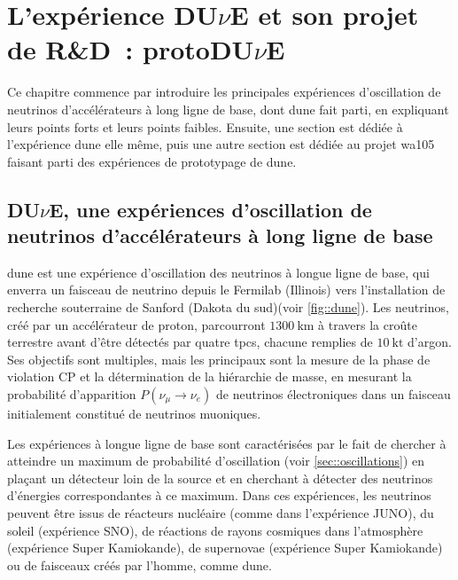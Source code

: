\chapter{L'expérience \texorpdfstring{DU$\nu$E}{DUNE} et son projet de R\&D~: \texorpdfstring{protoDU$\nu$E}{protoDUNE}}
    
    Ce chapitre commence par introduire les principales expériences d'oscillation de neutrinos d'accélérateurs à long ligne de base, dont \gls{dune} fait parti, en expliquant leurs points forts et leurs points faibles. Ensuite, une section est dédiée à l'expérience \gls{dune} elle même, puis une autre section est dédiée au projet \gls{wa105} faisant parti des expériences de prototypage de \gls{dune}.
        
    \section{DU$\nu$E, une expériences d'oscillation de neutrinos d'accélérateurs à long ligne de base}
    
        \gls{dune} est une expérience d'oscillation des neutrinos à longue ligne de base, qui enverra un faisceau de neutrino depuis le Fermilab (Illinois) vers l'installation de recherche souterraine de Sanford (Dakota du sud)(voir \autoref{fig::dune}). Les neutrinos, créé par un accélérateur de proton, parcourront $\SI{1300}{\kilo\meter}$ à travers la croûte terrestre avant d'être détectés par quatre \glspl{tpc}, chacune remplies de $\SI{10}{\kilo\tonne}$ d'argon. Ses objectifs sont multiples, mais les principaux sont la mesure de la phase de violation CP et la détermination de la hiérarchie de masse, en mesurant la probabilité d'apparition $P(\nu_{\mu}\to\nu_e)$ de neutrinos électroniques dans un faisceau initialement constitué de neutrinos muoniques.
        
        Les expériences à longue ligne de base sont caractérisées par le fait de chercher à atteindre un maximum de probabilité d'oscillation (voir \autoref{sec::oscillations}) en plaçant un détecteur loin de la source et en cherchant à détecter des neutrinos d'énergies correspondantes à ce maximum. Dans ces expériences, les neutrinos peuvent être issus de réacteurs nucléaire (comme dans l'expérience JUNO\cite{juno}), du soleil (expérience SNO\cite{sno}), de réactions de rayons cosmiques dans l'atmosphère (expérience Super Kamiokande\cite{skk_atm}), de supernovae (expérience Super Kamiokande\cite{skk_atm}) ou de faisceaux créés par l'homme, comme \gls{dune}.
        
